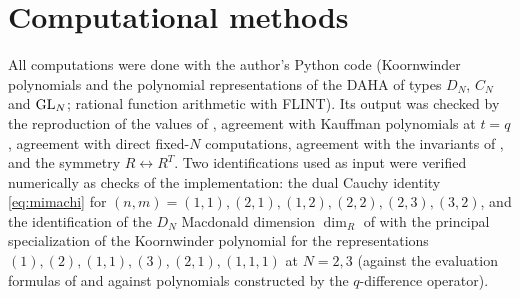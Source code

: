 \section{Computational methods}\label{app:code}
All computations were done with the author's Python code (Koornwinder polynomials and the polynomial representations of the DAHA of types $D_N$, $C_N$ and $\mathrm{GL}_N$; rational function arithmetic with FLINT). Its output was checked by the reproduction of the values of \cite{Marino09}, agreement with Kauffman polynomials at $t = q$, agreement with direct fixed-$N$ computations, agreement with the invariants of \cite{KN17}, and the symmetry $R \leftrightarrow R^T$. Two identifications used as input were verified numerically as checks of the implementation: the dual Cauchy identity \eqref{eq:mimachi} for $(n, m) = (1,1), (2,1), (1,2), (2,2), (2,3), (3,2)$, and the identification of the $D_N$ Macdonald dimension $\dim_R$ of \cite{AgSc12} with the principal specialization of the Koornwinder polynomial for the representations $(1), (2), (1,1), (3), (2,1), (1,1,1)$ at $N = 2, 3$ (against the evaluation formulas of \cite{vD96,Sahi99} and against polynomials constructed by the $q$-difference operator).

